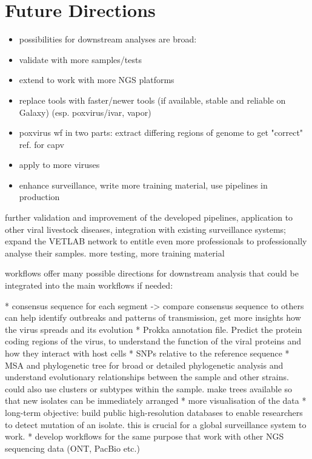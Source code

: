 \section{Future Directions}
\begin{itemize}
    \item possibilities for downstream analyses are broad: 
    \item validate with more samples/tests
    \item extend to work with more NGS platforms
    \item replace tools with faster/newer tools (if available, stable and reliable on Galaxy) (esp. poxvirus/ivar, vapor)
    \item poxvirus wf in two parts: extract differing regions of genome to get "correct" ref. for capv
    \item apply to more viruses
    \item enhance surveillance, write more training material, use pipelines in production
\end{itemize}

further validation and improvement of the developed pipelines, application to other viral livestock diseases, integration with existing surveillance systems; expand the \ac{VETLAB} network to entitle even more professionals to professionally analyse their samples.
more testing, more training material

workflows offer many possible directions for downstream analysis that could be integrated into the main workflows if needed:

* consensus sequence for each segment -> compare consensus sequence to others can help identify outbreaks and patterns of transmission, get more insights how the virus spreads and its evolution
* Prokka annotation file. Predict the protein coding regions of the virus, to understand the function of the viral proteins and how they interact with host cells
* SNPs relative to the reference sequence
* \ac{MSA} and phylogenetic tree for broad or detailed phylogenetic analysis and understand evolutionary relationships between the sample and other strains. could also use clusters or subtypes within the sample. make trees available so that new isolates can be immediately arranged
* more visualisation of the data
* long-term objective: build public high-resolution databases to enable researchers to detect mutation of an isolate. this is crucial for a global surveillance system to work.
* develop workflows for the same purpose that work with other NGS sequencing data (ONT, PacBio etc.)
